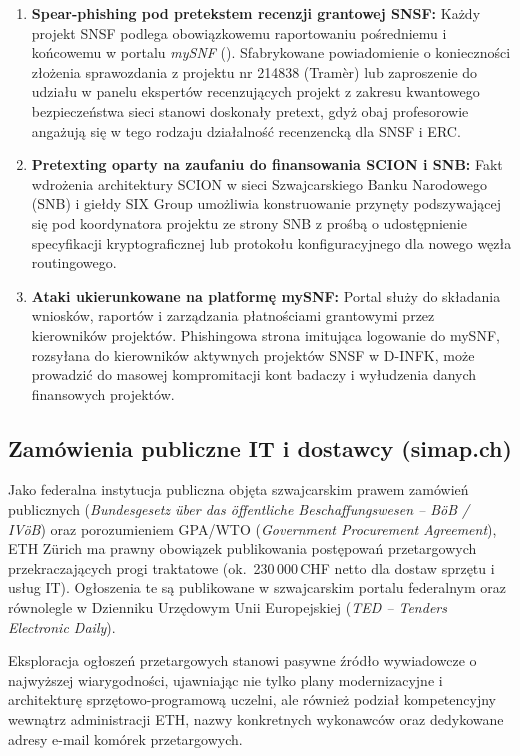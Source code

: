 \begin{enumerate}
    \item \textbf{Spear-phishing pod pretekstem recenzji grantowej SNSF:} Każdy projekt SNSF podlega obowiązkowemu raportowaniu pośredniemu i końcowemu w portalu \textit{mySNF} (). Sfabrykowane powiadomienie o konieczności złożenia sprawozdania z projektu nr 214838 (Tramèr) lub zaproszenie do udziału w panelu ekspertów recenzujących projekt z zakresu kwantowego bezpieczeństwa sieci stanowi doskonały pretext, gdyż obaj profesorowie angażują się w tego rodzaju działalność recenzencką dla SNSF i ERC.
    \item \textbf{Pretexting oparty na zaufaniu do finansowania SCION i SNB:} Fakt wdrożenia architektury SCION w sieci Szwajcarskiego Banku Narodowego (SNB) i giełdy SIX Group umożliwia konstruowanie przynęty podszywającej się pod koordynatora projektu ze strony SNB z prośbą o udostępnienie specyfikacji kryptograficznej lub protokołu konfiguracyjnego dla nowego węzła routingowego.
    \item \textbf{Ataki ukierunkowane na platformę mySNF:} Portal  służy do składania wniosków, raportów i zarządzania płatnościami grantowymi przez kierowników projektów. Phishingowa strona imitująca logowanie do mySNF, rozsyłana do kierowników aktywnych projektów SNSF w D-INFK, może prowadzić do masowej kompromitacji kont badaczy i wyłudzenia danych finansowych projektów.
\end{enumerate}

\subsection{Zamówienia publiczne IT i dostawcy (simap.ch)}\label{subsec:zamowienia-simap}

Jako federalna instytucja publiczna objęta szwajcarskim prawem zamówień publicznych (\textit{Bundesgesetz über das öffentliche Beschaffungswesen -- BöB / IVöB}) oraz porozumieniem GPA/WTO (\textit{Government Procurement Agreement}), ETH Zürich ma prawny obowiązek publikowania postępowań przetargowych przekraczających progi traktatowe (ok.\ 230\,000\,CHF netto dla dostaw sprzętu i usług IT). Ogłoszenia te są publikowane w szwajcarskim portalu federalnym  oraz równolegle w Dzienniku Urzędowym Unii Europejskiej (\textit{TED -- Tenders Electronic Daily}).

Eksploracja ogłoszeń przetargowych stanowi pasywne źródło wywiadowcze o najwyższej wiarygodności, ujawniając nie tylko plany modernizacyjne i architekturę sprzętowo-programową uczelni, ale również podział kompetencyjny wewnątrz administracji ETH, nazwy konkretnych wykonawców oraz dedykowane adresy e-mail komórek przetargowych.

